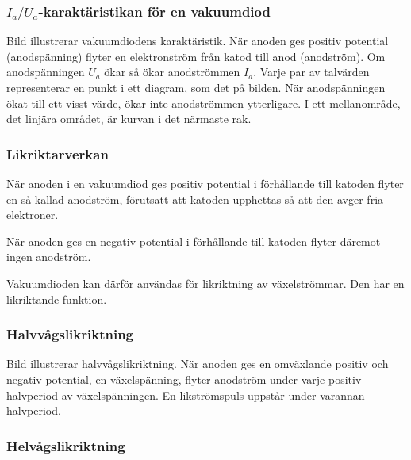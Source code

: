 \subsubsection{\(I_a/U_a\)-karaktäristikan för en vakuumdiod}


Bild  illustrerar vakuumdiodens karaktäristik.
När anoden ges positiv potential (anodspänning) flyter en elektronström från
katod till anod (anodström).
Om anodspänningen \(U_a\) ökar så ökar anodströmmen \(I_a\).
Varje par av talvärden representerar en punkt i ett diagram, som det på bilden.
När anodspänningen ökat till ett visst värde, ökar inte anodströmmen ytterligare.
I ett mellanområde, det linjära området, är kurvan i det närmaste rak.

\subsubsection{Likriktarverkan}

När anoden i en vakuumdiod ges positiv potential i förhållande till katoden
flyter en så kallad anodström, förutsatt att katoden upphettas så att den avger
fria elektroner.

När anoden ges en negativ potential i förhållande till katoden flyter däremot
ingen anodström.

Vakuumdioden kan därför användas för likriktning av växelströmmar.
Den har en likriktande funktion.

\newpage
\subsubsection{Halvvågslikriktning}

Bild  illustrerar halvvågslikriktning.
När anoden ges en omväxlande positiv och negativ potential, en växelspänning,
flyter anodström under varje positiv halvperiod av växelspänningen.
En likströmspuls uppstår under varannan halvperiod.

\newpage
{}

\subsubsection{Helvågslikriktning}

